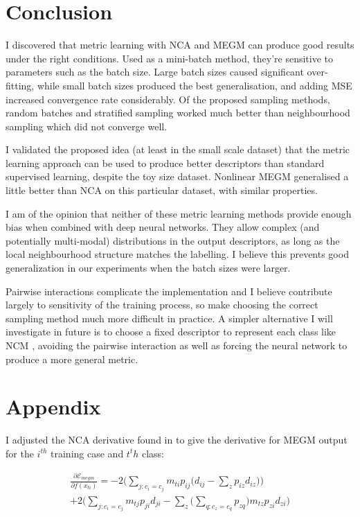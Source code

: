 \section {Conclusion}

I discovered that metric learning with \gls{NCA} and \gls{MEGM} can produce good results under the right conditions. Used as a mini-batch method, they're sensitive to parameters such as the batch size. Large batch sizes caused significant over-fitting,
while small batch sizes produced the best generalisation, and adding \gls{MSE} increased convergence rate considerably. Of the proposed sampling methods, random batches and stratified sampling worked much better than neighbourhood sampling which did not converge well.


I validated the proposed idea (at least in the small scale dataset) that the metric learning approach can be used to produce better descriptors than
standard supervised learning, despite the toy size dataset. Nonlinear \gls{MEGM} generalised a little better than NCA on this particular dataset, with similar
properties.

I am of the opinion that neither of these metric learning methods  provide enough bias when combined with deep neural networks. They allow
complex (and potentially multi-modal) distributions in the output descriptors, as long as the local neighbourhood structure matches the labelling. I believe
this prevents good generalization in our experiments when the batch sizes were larger.

Pairwise interactions complicate the implementation and I believe contribute largely to sensitivity of the training process, so make choosing the correct sampling method much more difficult in practice. A simpler alternative I will investigate in future is to choose a fixed descriptor to represent each class like \gls{NCM} \cite {Mensink2012}, avoiding the pairwise interaction as well as forcing the neural network to produce a more general metric.



\section{Appendix}
\label{sec:appendix}

 I adjusted the \gls{NCA} derivative found in \cite {Salakhutdinov2007a} to give the derivative for \gls{MEGM} output for the $ i^{th} $ training case and $ t^th $ class:


\begin{multline}
\label{eq:megm_grad}
\frac{\partial \mathcal{E}_{megm}}{\partial f(x_{ti})} = 
  -2 \bigg( \sum_{j:c_i = c_j}  m_{ti} {p_{ij} \Big( d_{ij} - \sum_z{p_{iz}d_{iz}} \Big) } \bigg)\\
  +2 \bigg( \sum_{j:c_i = c_j} m_{tj}{p_{ji}d_{ji} - \sum_z{\Big( \sum_{q:c_z = c_q}{p_{zq}} \Big) m_{tz}p_{zi}d_{zi}   }} \bigg)
\end{multline}

